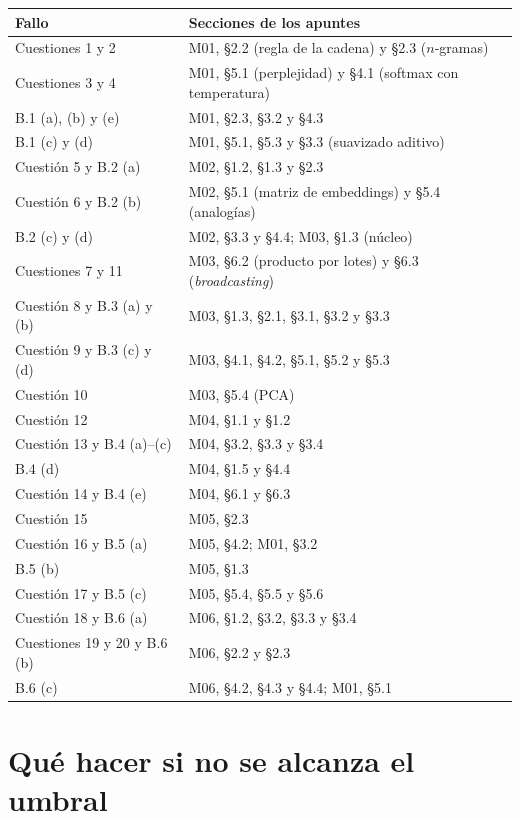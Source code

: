 \begin{center}
\small
\renewcommand{\arraystretch}{1.1}
\begin{tabularx}{\textwidth}{@{}>{\raggedright\arraybackslash}p{3.6cm}X@{}}
\toprule
Fallo & Secciones de los apuntes \\
\midrule
Cuestiones 1 y 2 & M01, §2.2 (regla de la cadena) y §2.3 ($n$-gramas) \\
Cuestiones 3 y 4 & M01, §5.1 (perplejidad) y §4.1 (softmax con temperatura) \\
B.1 (a), (b) y (e) & M01, §2.3, §3.2 y §4.3 \\
B.1 (c) y (d) & M01, §5.1, §5.3 y §3.3 (suavizado aditivo) \\
Cuestión 5 y B.2 (a) & M02, §1.2, §1.3 y §2.3 \\
Cuestión 6 y B.2 (b) & M02, §5.1 (matriz de embeddings) y §5.4 (analogías) \\
B.2 (c) y (d) & M02, §3.3 y §4.4; M03, §1.3 (núcleo) \\
Cuestiones 7 y 11 & M03, §6.2 (producto por lotes) y §6.3 (\emph{broadcasting}) \\
Cuestión 8 y B.3 (a) y (b) & M03, §1.3, §2.1, §3.1, §3.2 y §3.3 \\
Cuestión 9 y B.3 (c) y (d) & M03, §4.1, §4.2, §5.1, §5.2 y §5.3 \\
Cuestión 10 & M03, §5.4 (PCA) \\
Cuestión 12 & M04, §1.1 y §1.2 \\
Cuestión 13 y B.4 (a)--(c) & M04, §3.2, §3.3 y §3.4 \\
B.4 (d) & M04, §1.5 y §4.4 \\
Cuestión 14 y B.4 (e) & M04, §6.1 y §6.3 \\
Cuestión 15 & M05, §2.3 \\
Cuestión 16 y B.5 (a) & M05, §4.2; M01, §3.2 \\
B.5 (b) & M05, §1.3 \\
Cuestión 17 y B.5 (c) & M05, §5.4, §5.5 y §5.6 \\
Cuestión 18 y B.6 (a) & M06, §1.2, §3.2, §3.3 y §3.4 \\
Cuestiones 19 y 20 y B.6 (b) & M06, §2.2 y §2.3 \\
B.6 (c) & M06, §4.2, §4.3 y §4.4; M01, §5.1 \\
\bottomrule
\end{tabularx}
\end{center}

\section{Qué hacer si no se alcanza el umbral}

